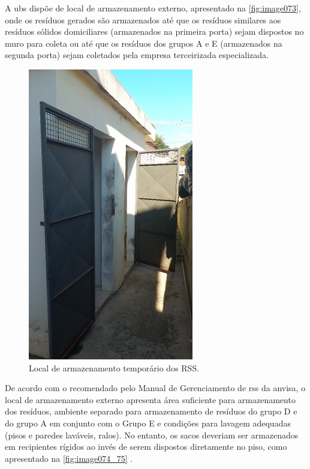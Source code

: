 	
	A \gls{ubs} dispõe de local de armazenamento externo, apresentado na \autoref{fig:image073}, onde os resíduos gerados são armazenados até que os resíduos similares aos resíduos sólidos domiciliares (armazenados na primeira porta) sejam dispostos no muro para coleta ou até que os resíduos dos grupos A e E (armazenados na segunda porta) sejam coletados pela empresa terceirizada especializada.
	
	\begin{figure}
		\centering
		\includegraphics[width=0.40\linewidth]{produtos/prodtres/image073}
		\caption{Local de armazenamento temporário dos RSS.}
		\label{fig:image073}
	\end{figure}
	
	
	De acordo com o recomendado pelo Manual de Gerenciamento de \gls{rss} da \gls{anvisa}, o local de armazenamento externo apresenta área suficiente para armazenamento dos resíduos, ambiente separado para armazenamento de resíduos do grupo D e do grupo A em conjunto com o Grupo E e condições para lavagem adequadas (pisos e paredes laváveis, ralos). No entanto, os sacos deveriam ser armazenados em recipientes rígidos ao invés de serem dispostos diretamente no piso, como apresentado na \autoref{fig:image074_75} \cite{anvisa:2006}.
	
